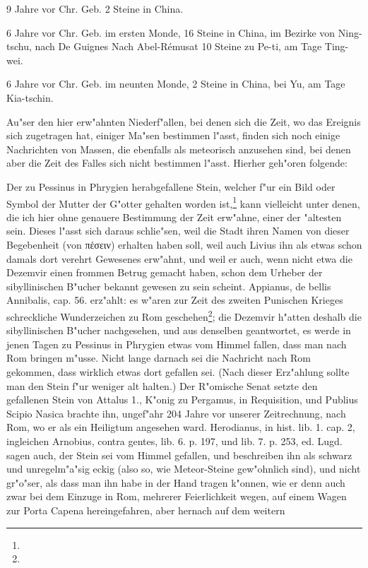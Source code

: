 \documentclass[a4paper, 11pt, oneside, polutonikogreek, german]{article}
\begin{document}
9 Jahre vor Chr. Geb. 2 Steine in China.

6 Jahre vor Chr. Geb. im ersten Monde, 16 Steine in China, im Bezirke von Ning-tschu, nach De Guignes Nach Abel-Rémusat 10 Steine zu Pe-ti, am Tage Ting-wei.

6 Jahre vor Chr. Geb. im neunten Monde, 2 Steine in China, bei Yu, am Tage Kia-tschin.

Au"ser den hier erw"ahnten Niederf"allen, bei denen sich die Zeit, wo das Ereignis sich zugetragen hat, einiger Ma"sen bestimmen l"asst, finden sich noch einige Nachrichten von Massen, die ebenfalls als meteorisch anzusehen sind, bei denen aber die Zeit des Falles sich nicht bestimmen l"asst. Hierher geh"oren folgende:

Der zu Pessinus in Phrygien herabgefallene Stein, welcher f"ur ein Bild oder Symbol der Mutter der G"otter gehalten worden ist,\footnote{} kann vielleicht unter denen, die ich hier ohne genauere Bestimmung der Zeit erw"ahne, einer der "altesten sein. Dieses l"asst sich daraus schlie"sen, weil die Stadt ihren Namen von dieser Begebenheit (von πἑσειν) erhalten haben soll, weil auch Livius ihn als etwas schon damals dort verehrt Gewesenes erw"ahnt, und weil er auch, wenn nicht etwa die Dezemvir einen frommen Betrug gemacht haben, schon dem Urheber der sibyllinischen B"ucher bekannt gewesen zu sein scheint. Appianus, de bellis Annibalis, cap. 56. erz"ahlt: es w"aren zur Zeit des zweiten Punischen Krieges schreckliche Wunderzeichen zu Rom geschehen\footnote{}; die Dezemvir h"atten deshalb die sibyllinischen B"ucher nachgesehen, und aus denselben geantwortet, es werde in jenen Tagen zu Pessinus in Phrygien etwas vom Himmel fallen, dass man nach Rom bringen m"usse. Nicht lange darnach sei die Nachricht nach Rom gekommen, dass wirklich etwas dort gefallen sei. (Nach dieser Erz"ahlung sollte man den Stein f"ur weniger alt halten.) Der R"omische Senat setzte den gefallenen Stein von Attalus 1., K"onig zu Pergamus, in Requisition, und Publius Scipio Nasica brachte ihn, ungef"ahr 204 Jahre vor unserer Zeitrechnung, nach Rom, wo er als ein Heiligtum angesehen ward. Herodianus, in hist. lib. 1. cap. 2, ingleichen Arnobius, contra gentes, lib. 6. p. 197, und lib. 7. p. 253, ed. Lugd. sagen auch, der Stein sei vom Himmel gefallen, und beschreiben ihn als schwarz und unregelm"a"sig eckig (also so, wie Meteor-Steine gew"ohnlich sind), und nicht gr"o"ser, als dass man ihn habe in der Hand tragen k"onnen, wie er denn auch zwar bei dem Einzuge in Rom, mehrerer Feierlichkeit wegen, auf einem Wagen zur Porta Capena hereingefahren, aber hernach auf dem weitern 
\end{document}
